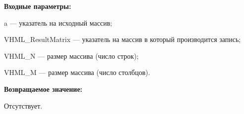 \textbf{Входные параметры:}  
 
a --- указатель на исходный массив;
 
VHML\_ResultMatrix --- указатель на массив в который производится запись;
 
VHML\_N --- размер массива (число строк);
 
VHML\_M --- размер массива (число столбцов).

\textbf{Возвращаемое значение:}

Отсутствует.